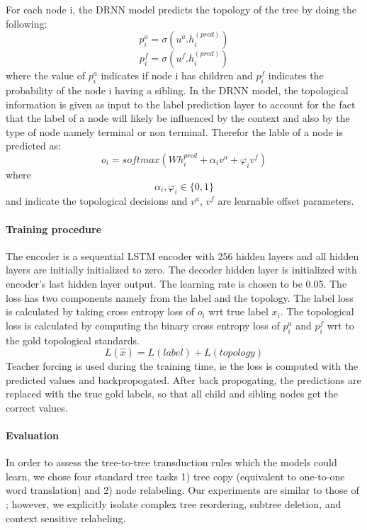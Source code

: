 \documentclass[11pt,a4paper]{article}
\begin{document}
For each node i, the DRNN model predicts the topology of the tree by doing the following:
\[p_{i}^{a} = \sigma{(u^a.h_{i}^{(pred)})}\]
\[p_{i}^{f} = \sigma{(u^f.h_{i}^{(pred)})}\]
where the value of $p_{i}^{a}$ indicates if node i has children and $p_{i}^{f}$ indicates the probability of the node i having a sibling. 
In the DRNN model, the topological information is given as input to the label prediction layer to account for the fact that the label of a node will likely be influenced by the context and also by the type of node namely terminal or non terminal. Therefor the lable of a node is predicted as:
\[o_{i} = softmax(Wh_{i}^{pred} + \alpha_{i}v^{a} + \varphi_{i}v^{f})\]
where \[\alpha_{i}, \varphi_{i}\in\{0,1\}\] and indicate the topological decisions and $v^{a}$, $v^{f}$ are learnable offset parameters.

\paragraph{Training procedure}
The encoder is a sequential LSTM encoder with 256 hidden layers and all hidden layers are initially initialized to zero. The decoder hidden layer is initialized with encoder's last hidden layer output. The learning rate is chosen to be 0.05.
The loss has two components namely from the label and the topology. The label loss is calculated by taking cross entropy loss of $o_{i}$ wrt true label $x_{i}$. The topological loss is calculated by computing the binary cross entropy loss of $p_{i}^{a}$ and $p_{i}^{f}$ wrt to the gold topological standards.
\[L(\hat{x}) = L(label) + L(topology)\]
Teacher forcing is used during the training time, ie the loss is computed with the predicted values and backpropogated. After back propogating, the predictions are replaced with the true gold labels, so that all child and sibling nodes get the correct values. 


\paragraph{Evaluation}
In order to assess the tree-to-tree transduction rules which the models could learn, we chose four standard tree tasks 1) tree copy (equivalent to one-to-one word translation) and 2) node relabeling. Our experiments are similar to those of \citet{grefenstette2015learning}; however, we explicitly isolate complex tree reordering, subtree deletion, and context sensitive relabeling. 
\end{document}
